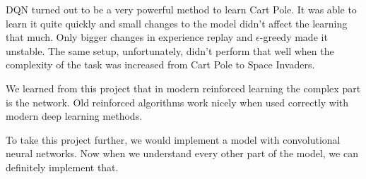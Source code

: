 DQN turned out to be a very powerful method to learn Cart Pole. It was able to learn it quite quickly and small changes to the model didn't affect the learning that much. Only bigger changes in experience replay and $\epsilon$-greedy made it unstable. The same setup, unfortunately, didn't perform that well when the complexity of the task was increased from Cart Pole to Space Invaders.

We learned from this project that in modern reinforced learning the complex part is the network. Old reinforced algorithms work nicely when used correctly with modern deep learning methods.

To take this project further, we would implement a model with convolutional neural networks. Now when we understand every other part of the model, we can definitely implement that.